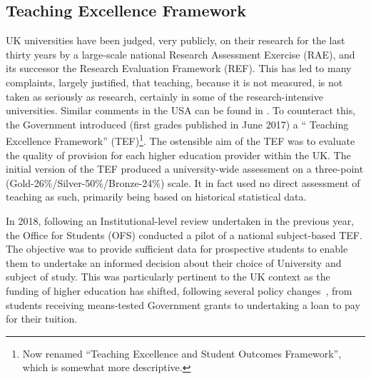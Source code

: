 \documentclass[conference]{IEEEtran}
\begin{document}
\subsection{Teaching Excellence Framework}

UK universities have been judged, very publicly, on their research for
the last thirty years by a large-scale national Research Assessment
Exercise (RAE), and its successor the Research Evaluation Framework
(REF). This has led to many complaints, largely justified, that
teaching, because it is not measured, is not taken as seriously as
research, certainly in some of the research-intensive
universities. Similar comments in the USA can be found in
\cite{Campbelletal2018a}. To counteract this, the Government
introduced (first grades published in June 2017) a `` Teaching
Excellence Framework'' (TEF)\footnote{Now renamed ``Teaching
Excellence and Student Outcomes Framework'', which is somewhat more
descriptive.}. The ostensible aim of the TEF was to evaluate the
quality of provision for each higher education provider within the
UK. The initial version of the TEF produced a
university-wide assessment on a three-point
(Gold-26\%/Silver-50\%/Bronze-24\%) scale. It in fact used no
direct assessment of teaching as such, primarily being based on
historical statistical data.

In 2018, following an Institutional-level review undertaken in the
previous year, the Office for Students (OFS) conducted a pilot of a
national subject-based TEF. The objective was to provide sufficient
data for prospective students to enable them to undertake an informed
decision about their choice of University and subject of study. This
was particularly pertinent to the UK context as the funding of higher
education has shifted, following several policy
changes~\cite{BIS2010a}, from students receiving means-tested
Government grants to undertaking a loan to pay for their tuition.
\end{document}

